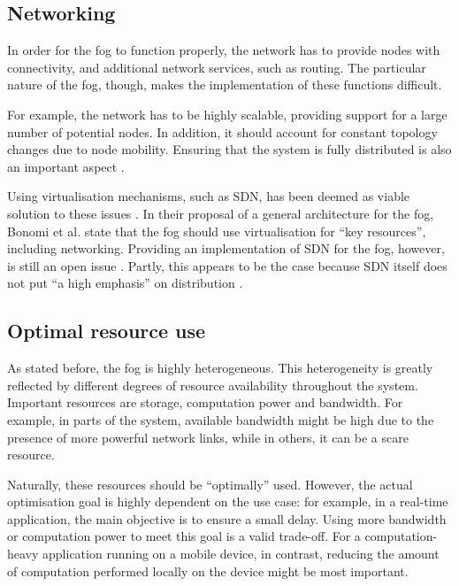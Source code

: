 \documentclass{article}
\begin{document}
\subsection{Networking}
In order for the fog to function properly, the network has to provide nodes with connectivity, and additional network services, such as routing. The particular nature of the fog, though, makes the implementation of these functions difficult. 

For example, the network has to be highly scalable, providing support for a large number of potential nodes. In addition, it should account for constant topology changes due to node mobility. Ensuring that the system is fully distributed is also an important aspect \cite{yi2015survey}.

Using virtualisation mechanisms, such as SDN, has been deemed as viable solution to these issues \cite{yi2015survey}. In their proposal of a general architecture for the fog, Bonomi et al. \cite{bonomi2014fog} state that the fog should use virtualisation for ``key resources'', including networking. Providing an implementation of SDN for the fog, however, is still an open issue \cite{yi2015survey}. Partly, this appears to be the case because SDN itself does not put ``a high emphasis'' on distribution \cite{peng2016fog}.


\subsection{Optimal resource use}
\label{sub_opt_res_use}

As stated before, the fog is highly heterogeneous. This heterogeneity is greatly reflected by different degrees of resource availability throughout the system. Important resources are storage, computation power and bandwidth. For example, in parts of the system, available bandwidth might be high due to the presence of more powerful network links, while in others, it can be a scare resource.

Naturally, these resources should be ``optimally'' used. However, the actual optimisation goal is highly dependent on the use case: for example, in a real-time application, the main objective is to ensure a small delay. Using more bandwidth or computation power to meet this goal is a valid trade-off. For a computation-heavy application running on a mobile device, in contrast, reducing the amount of computation performed locally on the device might be most important.
\end{document}
